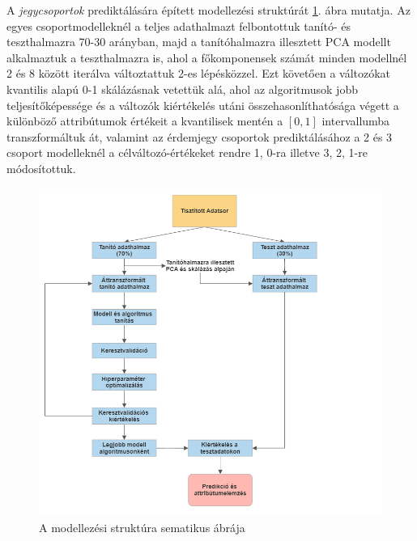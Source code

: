 \documentclass[12pt]{article}
\begin{document}
A \textit{jegycsoportok} prediktálására épített modellezési struktúrát \ref{fig:modell}. ábra mutatja. Az egyes csoportmodelleknél a teljes adathalmazt felbontottuk tanító- és teszthalmazra 70-30 arányban, majd a tanítóhalmazra illesztett PCA modellt alkalmaztuk a teszthalmazra is, ahol a főkomponensek számát minden modellnél 2 és 8 között iterálva változtattuk 2-es lépésközzel. Ezt követően a változókat kvantilis alapú 0-1 skálázásnak vetettük alá, ahol az algoritmusok jobb teljesítőképessége és a változók kiértékelés utáni összehasonlíthatósága végett a különböző attribútumok értékeit a kvantilisek mentén a $[0, 1]$ intervallumba transzformáltuk át, valamint az érdemjegy csoportok prediktálásához a 2 és 3 csoport modelleknél a célváltozó-értékeket rendre 1, 0-ra illetve 3, 2, 1-re módosítottuk. 

\begin{figure}[h]
\centering
\includegraphics[scale=0.6]{kepek/flowchart.png}
\caption{A modellezési struktúra sematikus ábrája}
\label{fig:modell}
\end{figure}
\end{document}
